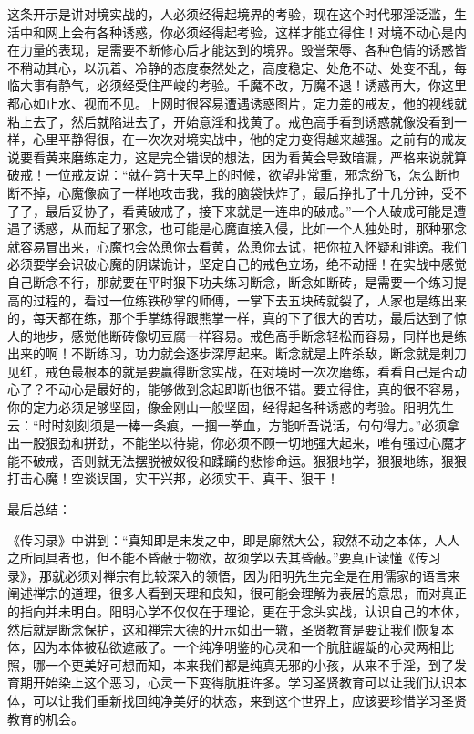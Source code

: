 这条开示是讲对境实战的，人必须经得起境界的考验，现在这个时代邪淫泛滥，生活中和网上会有各种诱惑，你必须经得起考验，这样才能立得住！对境不动心是内在力量的表现，是需要不断修心后才能达到的境界。毁誉荣辱、各种色情的诱惑皆不稍动其心，以沉着、冷静的态度泰然处之，高度稳定、处危不动、处变不乱，每临大事有静气，必须经受住严峻的考验。千魔不改，万魔不退！诱惑再大，你这里都心如止水、视而不见。上网时很容易遭遇诱惑图片，定力差的戒友，他的视线就粘上去了，然后就陷进去了，开始意淫和找黄了。戒色高手看到诱惑就像没看到一样，心里平静得很，在一次次对境实战中，他的定力变得越来越强。之前有的戒友说要看黄来磨练定力，这是完全错误的想法，因为看黄会导致暗漏，严格来说就算破戒！一位戒友说：“就在第十天早上的时候，欲望非常重，邪念纷飞，怎么断也断不掉，心魔像疯了一样地攻击我，我的脑袋快炸了，最后挣扎了十几分钟，受不了了，最后妥协了，看黄破戒了，接下来就是一连串的破戒。”一个人破戒可能是遭遇了诱惑，从而起了邪念，也可能是心魔直接入侵，比如一个人独处时，那种邪念就容易冒出来，心魔也会怂恿你去看黄，怂恿你去试，把你拉入怀疑和诽谤。我们必须要学会识破心魔的阴谋诡计，坚定自己的戒色立场，绝不动摇！在实战中感觉自己断念不行，那就要在平时狠下功夫练习断念，断念如断砖，是需要一个练习提高的过程的，看过一位练铁砂掌的师傅，一掌下去五块砖就裂了，人家也是练出来的，每天都在练，那个手掌练得跟熊掌一样，真的下了很大的苦功，最后达到了惊人的地步，感觉他断砖像切豆腐一样容易。戒色高手断念轻松而容易，同样也是练出来的啊！不断练习，功力就会逐步深厚起来。断念就是上阵杀敌，断念就是刺刀见红，戒色最根本的就是要赢得断念实战，在对境时一次次磨练，看看自己是否动心了？不动心是最好的，能够做到念起即断也很不错。要立得住，真的很不容易，你的定力必须足够坚固，像金刚山一般坚固，经得起各种诱惑的考验。阳明先生云：“时时刻刻须是一棒一条痕，一掴一拳血，方能听吾说话，句句得力。”必须拿出一股狠劲和拼劲，不能坐以待毙，你必须不顾一切地强大起来，唯有强过心魔才能不破戒，否则就无法摆脱被奴役和蹂躏的悲惨命运。狠狠地学，狠狠地练，狠狠打击心魔！空谈误国，实干兴邦，必须实干、真干、狠干！

最后总结：

《传习录》中讲到：“真知即是未发之中，即是廓然大公，寂然不动之本体，人人之所同具者也，但不能不昏蔽于物欲，故须学以去其昏蔽。”要真正读懂《传习录》，那就必须对禅宗有比较深入的领悟，因为阳明先生完全是在用儒家的语言来阐述禅宗的道理，很多人看到天理和良知，很可能会理解为表层的意思，而对真正的指向并未明白。阳明心学不仅仅在于理论，更在于念头实战，认识自己的本体，然后就是断念保护，这和禅宗大德的开示如出一辙，圣贤教育是要让我们恢复本体，因为本体被私欲遮蔽了。一个纯净明鉴的心灵和一个肮脏龌龊的心灵两相比照，哪一个更美好可想而知，本来我们都是纯真无邪的小孩，从来不手淫，到了发育期开始染上这个恶习，心灵一下变得肮脏许多。学习圣贤教育可以让我们认识本体，可以让我们重新找回纯净美好的状态，来到这个世界上，应该要珍惜学习圣贤教育的机会。

